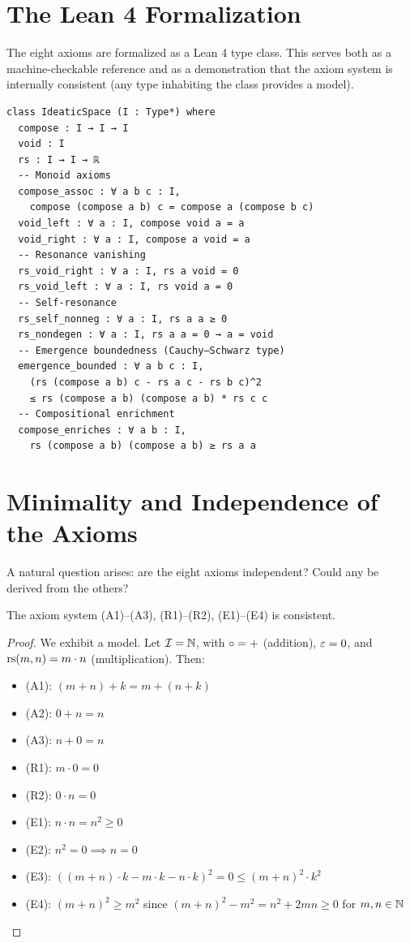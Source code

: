 \section{The Lean 4 Formalization}

The eight axioms are formalized as a Lean 4 type class. This serves both
as a machine-checkable reference and as a demonstration that the axiom
system is internally consistent (any type inhabiting the class provides a
model).

\begin{lstlisting}[language=Lean4, caption={The \texttt{IdeaticSpace}
type class}]
class IdeaticSpace (I : Type*) where
  compose : I → I → I
  void : I
  rs : I → I → ℝ
  -- Monoid axioms
  compose_assoc : ∀ a b c : I,
    compose (compose a b) c = compose a (compose b c)
  void_left : ∀ a : I, compose void a = a
  void_right : ∀ a : I, compose a void = a
  -- Resonance vanishing
  rs_void_right : ∀ a : I, rs a void = 0
  rs_void_left : ∀ a : I, rs void a = 0
  -- Self-resonance
  rs_self_nonneg : ∀ a : I, rs a a ≥ 0
  rs_nondegen : ∀ a : I, rs a a = 0 → a = void
  -- Emergence boundedness (Cauchy–Schwarz type)
  emergence_bounded : ∀ a b c : I,
    (rs (compose a b) c - rs a c - rs b c)^2
    ≤ rs (compose a b) (compose a b) * rs c c
  -- Compositional enrichment
  compose_enriches : ∀ a b : I,
    rs (compose a b) (compose a b) ≥ rs a a
\end{lstlisting}

\section{Minimality and Independence of the Axioms}

A natural question arises: are the eight axioms independent? Could any be
derived from the others?

\begin{theorem}[Consistency]\label{thm:consistency}
The axiom system (A1)--(A3), (R1)--(R2), (E1)--(E4) is consistent.
\end{theorem}
\begin{proof}
We exhibit a model. Let $\mathcal{I} = \mathbb{N}$, with $\circ = +$ (addition),
$\varepsilon = 0$, and $\mathrm{rs}(m, n) = m \cdot n$ (multiplication). Then:
\begin{itemize}
    \item (A1): $(m + n) + k = m + (n + k)$ \checkmark
    \item (A2): $0 + n = n$ \checkmark
    \item (A3): $n + 0 = n$ \checkmark
    \item (R1): $m \cdot 0 = 0$ \checkmark
    \item (R2): $0 \cdot n = 0$ \checkmark
    \item (E1): $n \cdot n = n^2 \geq 0$ \checkmark
    \item (E2): $n^2 = 0 \implies n = 0$ \checkmark
    \item (E3): $((m+n) \cdot k - m \cdot k - n \cdot k)^2 = 0 \leq
          (m+n)^2 \cdot k^2$ \checkmark
    \item (E4): $(m+n)^2 \geq m^2$ since $(m+n)^2 - m^2 = n^2 + 2mn
          \geq 0$ for $m, n \in \mathbb{N}$ \checkmark
\end{itemize}
\end{proof}

